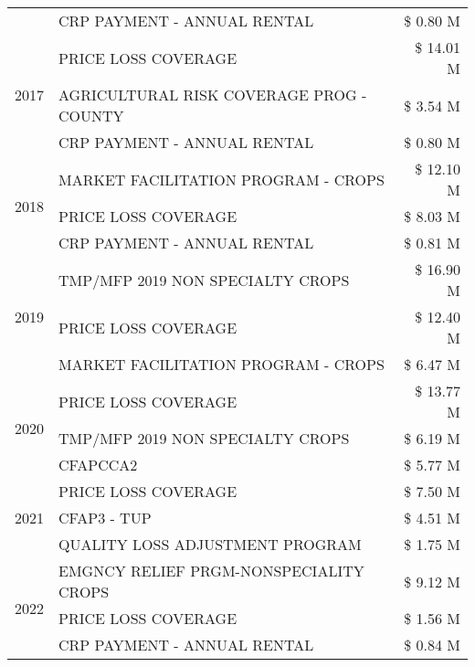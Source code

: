 \begin{tabular}{llr}
 & CRP PAYMENT - ANNUAL RENTAL & \$ 0.80 M \\
\cline{1-3}
\multirow[t]{3}{*}{2017} & PRICE LOSS COVERAGE & \$ 14.01 M \\
 & AGRICULTURAL RISK COVERAGE PROG - COUNTY & \$ 3.54 M \\
 & CRP PAYMENT - ANNUAL RENTAL & \$ 0.80 M \\
\cline{1-3}
\multirow[t]{3}{*}{2018} & MARKET FACILITATION PROGRAM - CROPS & \$ 12.10 M \\
 & PRICE LOSS COVERAGE & \$ 8.03 M \\
 & CRP PAYMENT - ANNUAL RENTAL & \$ 0.81 M \\
\cline{1-3}
\multirow[t]{3}{*}{2019} & TMP/MFP 2019 NON SPECIALTY CROPS & \$ 16.90 M \\
 & PRICE LOSS COVERAGE & \$ 12.40 M \\
 & MARKET FACILITATION PROGRAM - CROPS & \$ 6.47 M \\
\cline{1-3}
\multirow[t]{3}{*}{2020} & PRICE LOSS COVERAGE & \$ 13.77 M \\
 & TMP/MFP 2019 NON SPECIALTY CROPS & \$ 6.19 M \\
 & CFAPCCA2 & \$ 5.77 M \\
\cline{1-3}
\multirow[t]{3}{*}{2021} & PRICE LOSS COVERAGE & \$ 7.50 M \\
 & CFAP3 - TUP & \$ 4.51 M \\
 & QUALITY LOSS ADJUSTMENT PROGRAM & \$ 1.75 M \\
\cline{1-3}
\multirow[t]{3}{*}{2022} & EMGNCY RELIEF PRGM-NONSPECIALITY CROPS & \$ 9.12 M \\
 & PRICE LOSS COVERAGE & \$ 1.56 M \\
 & CRP PAYMENT - ANNUAL RENTAL & \$ 0.84 M \\
\cline{1-3}
\bottomrule
\end{tabular}
